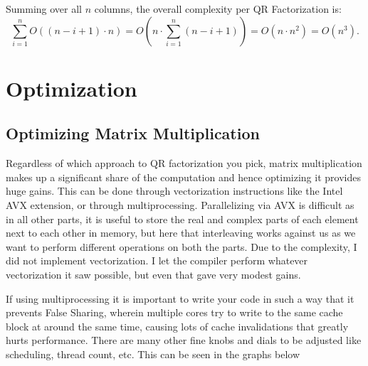 \documentclass[12pt,a4paper]{article}
\begin{document}
Summing over all \( n \) columns, the overall complexity per QR Factorization is:
\[
\sum_{i=1}^{n} O((n-i+1) \cdot n) = O(n \cdot \sum_{i=1}^{n} (n-i+1)) = O(n \cdot n^2) = O(n^3).
\]

\section{Optimization}

\subsection{Optimizing Matrix Multiplication}
Regardless of which approach to QR factorization you pick, matrix multiplication makes up a significant share of the computation and hence optimizing it provides huge gains. This can be done through vectorization instructions like the Intel AVX extension, or through multiprocessing. Parallelizing via AVX is difficult as in all other parts, it is useful to store the real and complex parts of each element next to each other in memory, but here that interleaving works against us as we want to perform different operations on both the parts. Due to the complexity, I did not implement vectorization. I let the compiler perform whatever vectorization it saw possible, but even that gave very modest gains.

If using multiprocessing it is important to write your code in such a way that it prevents False Sharing, wherein multiple cores try to write to the same cache block at around the same time, causing lots of cache invalidations that greatly hurts performance. There are many other fine knobs and dials to be adjusted like scheduling, thread count, etc. This can be seen in the graphs below

\\
\end{document}
